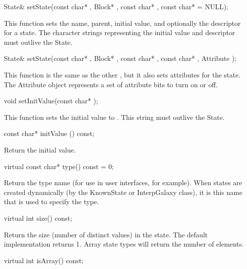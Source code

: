 \begin{example}
State& setState(const char* , Block* ,
               const char* , const char*  = NULL);
\end{example}

This function sets the name, parent, initial value, and optionally the
descriptor for a state.  The character strings representing the initial
value and descriptor must outlive the State.

\begin{example}
State& setState(const char* , Block* ,
               const char* , const char* ,
               Attribute );
\end{example}

This function is the same as the other , but it also
sets attributes for the state.  The Attribute object represents a
set of attribute bits to turn on or off.

\begin{example}
void setInitValue(const char* );
\end{example}

This function sets the initial value to .  This
string must outlive the State.

\begin{example}
const char* initValue () const;
\end{example}

Return the initial value.

\begin{example}
virtual const char* type() const = 0;
\end{example}

Return the type name (for use in user interfaces, for example).
When states are created dynamically (by the KnownState or InterpGalaxy
class), it is this name that is used to specify the type.

\begin{example}
virtual int size() const;
\end{example}

Return the size (number of distinct values) in the state.  The
default implementation returns 1.  Array state types will return the
number of elements.

\begin{example}
virtual int isArray() const;
\end{example}

